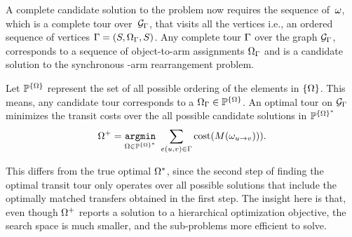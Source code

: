 A complete candidate solution to the problem now requires the sequence of~$ {\omega} $, 
which is a complete tour over~$ \mathcal{G}_{{\Gamma}} $, that visits all the vertices i.e., an ordered sequence of vertices ${\Gamma} = ( {S}, {{\Omega}}_{\Gamma}, {S}  )$.
{
\lemma [Tour]
Any complete tour $ {\Gamma} $ over the graph $ \mathcal{G}_{{\Gamma}} $, corresponds to a sequence of object-to-arm assignments $ {{\Omega}}_{\Gamma} $ and is a candidate solution to the synchronous \dual-arm rearrangement problem.
}



Let $ \mathbb{P}^{\{{{\Omega}}\}} $ represent the set of all possible ordering of the elements in $ \{{{\Omega}}\} $. This means, any candidate tour corresponds to a $ {{\Omega}}_{\Gamma}\in\mathbb{P}^{\{{{\Omega}}\}} $. An optimal tour on $ \mathcal{G}_{{\Gamma}} $ minimizes the transit costs over the all possible candidate solutions in  $ \mathbb{P}^{\{{{\Omega}}\}^*} $
\begin{equation}
{{\Omega}}^+ = \underset{ {{\Omega}} \in  \mathbb{P}^{\{{{\Omega}}\}^*}   }{ \mathtt{argmin} } \ \sum_{e(u,v)\in{\Gamma}}\textup{cost}({M}( {\omega}_{u\rightarrow v} ))  ).
\end{equation}

This differs from the true optimal $ {{\Omega}}^* $, since the second step of finding the optimal transit tour only operates over all possible solutions that include the optimally matched transfers obtained in the first step.
The insight here is that, even though $ {{\Omega}}^+ $ reports a solution to a hierarchical optimization objective, 
the search space is much smaller, and the sub-problems more efficient to solve.\\

\vspace{-0.1in}

